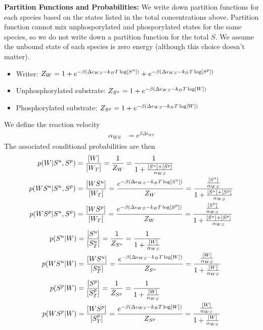 \documentclass[aps,onecolumn,superscriptaddress,notitlepage]{revtex4-1}
\begin{document}
\textbf{Partition Functions and Probabilities:}
We write down partition functions for each species based on the states listed in the total concentrations above. 
Partition function cannot mix unphosporylated and phosporylated states for the same species, 
so we do not write down a partition function for the total $S$.
We assume the unbound state of each species is zero energy (although this choice doesn't matter).
\begin{itemize}
\item Writer: $Z_W = 1 + e^{-\beta\qty(\Delta\epsilon_{WS} -k_BT \log[S^u])} + e^{-\beta(\Delta\epsilon_{WS} -k_BT \log[S^p])}$
\item Unphosphorylated substrate: $Z_{S^u} = 1 + e^{-\beta\qty(\Delta\epsilon_{WS} -k_BT \log[W])}$
\item Phosphorylated substrate: $Z_{S^p} = 1 + e^{-\beta\qty(\Delta\epsilon_{WS} -k_BT \log[W])}$
\end{itemize}
We define the reaction velocity
\begin{align}
\alpha_{WS} &= e^{\beta\Delta\epsilon_{WS}}
\end{align}
The associated conditional probabilities are then
\begin{align}
p(W|S^u,S^p) &= \frac{[W]}{[W_T]} = \frac{1}{Z_W} =  \frac{1}{1 + \frac{[S^u] +[S^p]}{\alpha_{WS}}}\\
p(WS^u|S^u,S^p) &= \frac{[WS^u]}{[W_T]}  = \frac{e^{-\beta\qty(\Delta\epsilon_{WS} -k_BT \log[S^u])}}{Z_W} =  \frac{\frac{[S^u]}{\alpha_{WS}}}{1 + \frac{[S^u] +[S^p]}{\alpha_{WS}}}\\
p(WS^p|S^u,S^p) &= \frac{[WS^p]}{[W_T]}  = \frac{e^{-\beta\qty(\Delta\epsilon_{WS} -k_BT \log[S^p])}}{Z_W} =  \frac{\frac{[S^p]}{\alpha_{WS}}}{1 + \frac{[S^u] +[S^p]}{\alpha_{WS}}}
\end{align}
\begin{align}
p(S^u|W) &= \frac{[S^u]}{[S^u_T]} = \frac{1}{Z_{S^u}} = \frac{1}{1 + \frac{[W]}{\alpha_{WS}}}\\
p(WS^u|W) &= \frac{[WS^u]}{[S^u_T]} = \frac{ e^{-\beta\qty(\Delta\epsilon_{WS} -k_BT \log[W])}}{Z_{S^u}} = \frac{\frac{[W]}{\alpha_{WS}}}{1 + \frac{[W]}{\alpha_{WS}}}
\end{align}
\begin{align}
p(S^p|W) &= \frac{[S^p]}{[S^p_T]} = \frac{1}{Z_{S^p}} = \frac{1}{1 + \frac{[W]}{\alpha_{WS}}}\\
p(WS^p|W) &= \frac{[WS^p]}{[S^p_T]} = \frac{ e^{-\beta\qty(\Delta\epsilon_{WS} -k_BT \log[W])}}{Z_{S^p}} = \frac{\frac{[W]}{\alpha_{WS}}}{1 + \frac{[W]}{\alpha_{WS}}}
\end{align}
\end{document}

